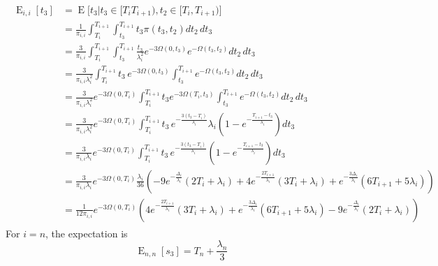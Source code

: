 \documentclass{article}
\DeclareMathOperator{\E}{E}
\begin{document}
\begin{align}
    \begin{split}
        \E_{i,i}[t_3] &= \E\big[t_3|t_3 \in [T_i T_{i+1}),t_2 \in [T_i,T_{i+1}) \big]\\
                      &= \frac{1}{\pi_{i,i}}\int_{T_i}^{T_{i+1}}\int_{t_3}^{T_{i+1}}t_3\pi(t_3,t_2)dt_2\,dt_3\\
                      &= \frac{3}{\pi_{i,i}}\int_{T_i}^{T_{i+1}}\int_{t_3}^{T_{i+1}}
                        \frac{t_3}{\lambda_i^2}e^{-3\Omega(0,t_3)}e^{-\Omega(t_3,t_2)}dt_2\,dt_3\\
                      &= \frac{3}{\pi_{i,i}\lambda_i^2}\int_{T_i}^{T_{i+1}}
                        t_3\,e^{-3\Omega(0,t_3)}\int_{t_3}^{T_{i+1}}e^{-\Omega(t_3,t_2)}dt_2\,dt_3\\
                    &= \frac{3}{\pi_{i,i}\lambda_i^2}e^{-3\Omega(0,T_i)}\int_{T_i}^{T_{i+1}}
                        t_3e^{-3\Omega(T_i,t_3)}\int_{t_3}^{T_{i+1}}e^{-\Omega(t_3,t_2)}dt_2\,dt_3\\
                    &= \frac{3}{\pi_{i,i}\lambda_i^2}e^{-3\Omega(0,T_i)}
                        \int_{T_i}^{T_{i+1}}
                        t_3\,e^{-\frac{3(t_3-T_i)}{\lambda_i}}
                        \lambda_i\left(1-e^{-\frac{T_{i+1}-t_3}{\lambda_i}}\right)dt_3\\
                    &= \frac{3}{\pi_{i,i}\lambda_i}e^{-3\Omega(0,T_i)}
                        \int_{T_i}^{T_{i+1}}
                        t_3\,e^{-\frac{3(t_3-T_i)}{\lambda_i}}
                        \left(1-e^{-\frac{T_{i+1}-t_3}{\lambda_i}}\right)dt_3\\
                    &= \frac{3}{\pi_{i,i}\lambda_i}e^{-3\Omega(0,T_i)}
                        \frac{\lambda_i}{36}\left(
                            -9e^{-\frac{\Delta_i}{\lambda_i}}(2T_i+\lambda_i)+4e^{-\frac{2T_{i+1}}{\lambda_i}}(3T_i+\lambda_i)
                            + e^{-\frac{3\Delta_i}{\lambda_i}}(6T_{i+1}+5\lambda_i)
                        \right)\\
                    &= \frac{1}{12\pi_{i,i}}e^{-3\Omega(0,T_i)}
                        \left(
                            4e^{-\frac{2T_{i+1}}{\lambda_i}}(3T_i+\lambda_i)
                            + e^{-\frac{3\Delta_i}{\lambda_i}}(6T_{i+1}+5\lambda_i)-9e^{-\frac{\Delta_i}{\lambda_i}}(2T_i+\lambda_i)
                    \right)
    \end{split}
\end{align}
For $i = n$, the expectation is 
\begin{equation}
    \E_{n,n}[s_3] = T_n+\frac{\lambda_n}{3}
\end{equation}
\end{document}
